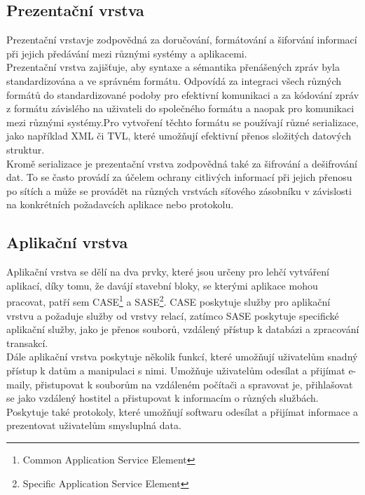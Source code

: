 \documentclass[12pt]{report}			%
\begin{document}
\cite{session_1}
\cite{session_2}
				\subsection{Prezentační vrstva}
Prezentační vrstavje zodpovědná za doručování, formátování a šiforvání informací při jejich předávání mezi různými systémy a aplikacemi.
\\
Prezentační vrstva zajišťuje, aby syntaxe a sémantika přenášených zpráv byla standardizována a ve správném formátu. Odpovídá za integraci všech různých formátů do standardizované podoby pro efektivní komunikaci a za kódování zpráv z formátu závislého na uživateli do společného formátu a naopak pro komunikaci mezi různými systémy.Pro vytvoření těchto formátu se používají různé serializace, jako například XML či TVL, které umožňují efektivní přenos složitých datových struktur. 
\\
Kromě serializace je prezentační vrstva zodpovědná také za šifrování a dešifrování dat. To se často provádí za účelem ochrany citlivých informací při jejich přenosu po sítích a může se provádět na různých vrstvách síťového zásobníku v závislosti na konkrétních požadavcích aplikace nebo protokolu.


\cite{presentation_1}
\cite{presentation_2}
\cite{presentation_3}

				\subsection{Aplikační vrstva}
Aplikační vrstva se dělí na dva prvky, které jsou určeny pro lehčí vytváření aplikací, díky tomu, že davájí stavební bloky, se kterými aplikace mohou pracovat, patří sem CASE\footnote{Common Application Service Element} a SASE\footnote{Specific Application Service Element}. CASE poskytuje služby pro aplikační vrstvu a požaduje služby od vrstvy relací, zatímco SASE poskytuje specifické aplikační služby, jako je přenos souborů, vzdálený přístup k databázi a zpracování transakcí.
\\
Dále aplikační vrstva poskytuje několik funkcí, které umožňují uživatelům snadný přístup k datům a manipulaci s nimi. Umožňuje uživatelům odesílat a přijímat e-maily, přistupovat k souborům na vzdáleném počítači a spravovat je, přihlašovat se jako vzdálený hostitel a přistupovat k informacím o různých službách. Poskytuje také protokoly, které umožňují softwaru odesílat a přijímat informace a prezentovat uživatelům smysluplná data.


\cite{aplication_1}
\cite{aplication_2}
\cite{aplication_3}
\end{document}

